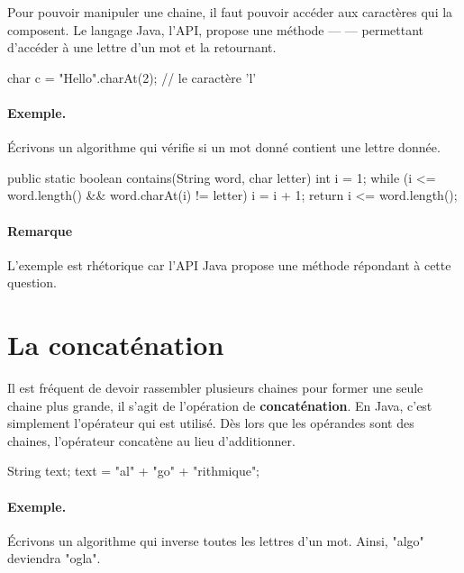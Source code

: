 	Pour pouvoir manipuler une chaine, il faut pouvoir accéder aux caractères
	qui la composent.  
	Le langage Java, l'API, propose une méthode — 
	—  permettant d'accéder à une lettre d'un mot et la retournant. 
	
	\begin{java}
char c = "Hello".charAt(2);		// le caractère 'l'
	\end{java}

	\paragraph{Exemple.}
	Écrivons un algorithme qui vérifie si un mot donné
	contient une lettre donnée.
	
	\begin{java}
public static boolean contains(String word, char letter){
	int i = 1;
	while (i <= word.length() && word.charAt(i) != letter){
		i = i + 1;
	}
	return i <= word.length();
}	
	\end{java}

	\paragraph{Remarque}

	L'exemple est rhétorique car l'API Java propose une méthode 
	répondant à cette question.  



\section{La concaténation}

	Il est fréquent de devoir rassembler plusieurs chaines pour former une
	seule chaine plus grande, il s’agit de l’opération de
	\textbf{concaténation}. En Java, c'est simplement l'opérateur \pc{+} qui
	est utilisé. Dès lors que les opérandes sont des chaines, l'opérateur
	concatène au lieu d'additionner. 
	
\begin{java}
String text;
text = "al" + "go" + "rithmique";
\end{java}
	
	\paragraph{Exemple.}
	Écrivons un algorithme qui inverse toutes les lettres d’un mot.
	Ainsi, "algo" deviendra "ogla".
	
